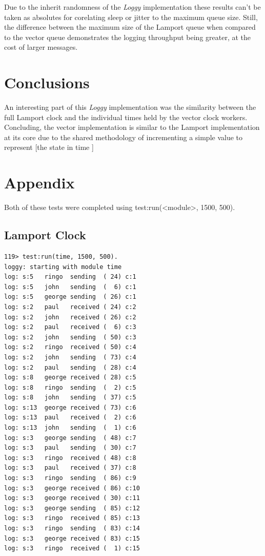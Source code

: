 \documentclass[a4paper, 11pt]{article}
\begin{document}
Due to the inherit randomness of the \textit{Loggy} implementation these results can't be taken as absolutes for corelating sleep or jitter to the maximum queue size.
Still, the difference between the maximum size of the Lamport queue when compared to the vector queue demonstrates the logging throughput being greater, at the cost of larger messages.



\section{Conclusions}


An interesting part of this \textit{Loggy} implementation was the similarity between the full Lamport clock and the individual times held by the vector clock workers.
Concluding, the vector implementation is similar to the Lamport implementation at its core due to the shared methodology of incrementing a simple value to represent [the state in time ]




\newpage
\section{Appendix}

Both of these tests were completed using test:run(<module>, 1500, 500).

\subsection{Lamport Clock}
\begin{verbatim}
119> test:run(time, 1500, 500).
loggy: starting with module time
log: s:5   ringo  sending  ( 24) c:1
log: s:5   john   sending  (  6) c:1
log: s:5   george sending  ( 26) c:1
log: s:2   paul   received ( 24) c:2
log: s:2   john   received ( 26) c:2
log: s:2   paul   received (  6) c:3
log: s:2   john   sending  ( 50) c:3
log: s:2   ringo  received ( 50) c:4
log: s:2   john   sending  ( 73) c:4
log: s:2   paul   sending  ( 28) c:4
log: s:8   george received ( 28) c:5
log: s:8   ringo  sending  (  2) c:5
log: s:8   john   sending  ( 37) c:5
log: s:13  george received ( 73) c:6
log: s:13  paul   received (  2) c:6
log: s:13  john   sending  (  1) c:6
log: s:3   george sending  ( 48) c:7
log: s:3   paul   sending  ( 30) c:7
log: s:3   ringo  received ( 48) c:8
log: s:3   paul   received ( 37) c:8
log: s:3   ringo  sending  ( 86) c:9
log: s:3   george received ( 86) c:10
log: s:3   george received ( 30) c:11
log: s:3   george sending  ( 85) c:12
log: s:3   ringo  received ( 85) c:13
log: s:3   ringo  sending  ( 83) c:14
log: s:3   george received ( 83) c:15
log: s:3   ringo  received (  1) c:15
\end{verbatim}
\end{document}
